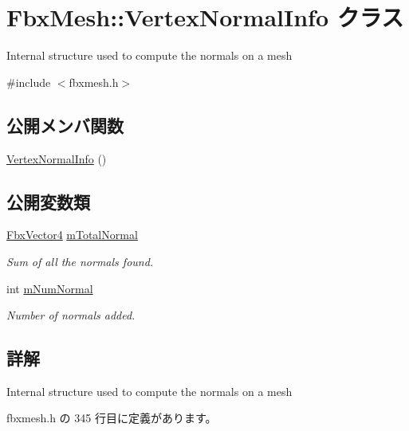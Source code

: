 \hypertarget{class_fbx_mesh_1_1_vertex_normal_info}{}\section{Fbx\+Mesh\+:\+:Vertex\+Normal\+Info クラス}
\label{class_fbx_mesh_1_1_vertex_normal_info}


Internal structure used to compute the normals on a mesh  




{\ttfamily \#include $<$fbxmesh.\+h$>$}

\subsection*{公開メンバ関数}
\begin{DoxyCompactItemize}
\item 
\hyperlink{class_fbx_mesh_1_1_vertex_normal_info_a8050efd1f9e0907b9581c93f49e90888}{Vertex\+Normal\+Info} ()
\end{DoxyCompactItemize}
\subsection*{公開変数類}
\begin{DoxyCompactItemize}
\item 
\hyperlink{class_fbx_vector4}{Fbx\+Vector4} \hyperlink{class_fbx_mesh_1_1_vertex_normal_info_a449e265248253dbb00e7e7d405a3d330}{m\+Total\+Normal}
\begin{DoxyCompactList}\small\item\em Sum of all the normals found. \end{DoxyCompactList}\item 
int \hyperlink{class_fbx_mesh_1_1_vertex_normal_info_abae0bef2c0c2e79be52aae93ca73c666}{m\+Num\+Normal}
\begin{DoxyCompactList}\small\item\em Number of normals added. \end{DoxyCompactList}\end{DoxyCompactItemize}


\subsection{詳解}
Internal structure used to compute the normals on a mesh 

 fbxmesh.\+h の 345 行目に定義があります。



